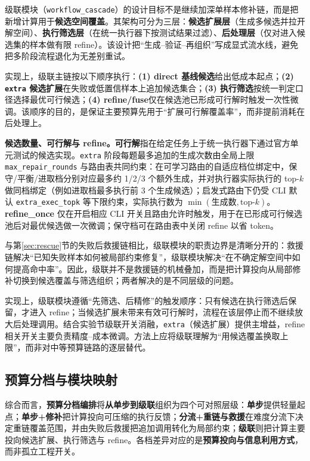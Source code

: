 级联模块（\texttt{workflow\_cascade}）的设计目标不是继续加深单样本修补链，而是把新增计算用于\textbf{候选空间覆盖}。其架构可分为三层：\textbf{候选扩展层}（生成多候选并拉开解空间）、\textbf{执行筛选层}（在统一执行器下按测试结果过滤）、\textbf{后处理层}（仅对进入候选集的样本做有限 refine）。该设计把“生成--验证--再组织”写成显式流水线，避免把多阶段流程退化为无差别重试\cite{li2022alphacode,li2025sstar}。

实现上，级联主链按以下顺序执行：\textbf{(1) direct 基线候选}给出低成本起点；\textbf{(2) \texttt{extra} 候选扩展}在失败或低置信样本上追加候选集合；\textbf{(3) 执行筛选}按统一判定口径选择最优可行候选；\textbf{(4) refine/fuse}仅在候选池已形成可行解时触发一次性微调。该顺序的目的，是保证主要预算先用于“扩展可行解覆盖率”，而非提前消耗在后处理上。

\textbf{候选数量、可行解与 refine。}\textbf{可行解}指在给定任务上于统一执行器下通过官方单元测试的候选实现。\texttt{extra} 阶段每题最多追加的生成次数由全局上限 \texttt{max\_repair\_rounds} 与路由表共同约束：在可学习路由的自适应档位绑定中，保守/平衡/进取档分别对应最多约 1/2/3 个额外生成，并对执行器实际执行的 top-$k$ 做同档绑定（例如进取档最多执行前 3 个生成候选）；启发式路由下仍受 CLI 默认 \texttt{extra\_exec\_topk} 等下限约束，实际执行数为 $\min(\text{生成数},\text{top-}k)$。\textbf{refine\_once} 仅在开启相应 CLI 开关且路由允许时触发，用于在已形成可行候选池后对最优候选做一次微调；保守档可在路由表中关闭 refine 以省 token。

与第\ref{sec:rescue}节的失败后救援链相比，级联模块的职责边界是清晰分开的：救援链解决“已知失败样本如何被局部约束修复”，级联模块解决“在不确定解空间中如何提高命中率”。因此，级联并不是救援链的机械叠加，而是把计算投向从局部修补切换到候选覆盖与筛选组织；两者解决的是不同层级的问题。

实现上，级联模块遵循“先筛选、后精修”的触发顺序：只有候选在执行筛选后保留，才进入 refine；当候选扩展未带来有效可行解时，流程在该层停止而不继续放大后处理调用。结合实验节级联开关消融，\texttt{extra}（候选扩展）提供主增益，refine 相关开关主要负责精度--成本微调。方法上应将级联理解为“用候选覆盖换取上限”，而非对中等预算链路的逐层替代。

\subsection{预算分档与模块映射}

综合而言，\textbf{预算分档编排}将\textbf{从单步到级联}组织为四个可对照层级：\textbf{单步}提供轻量起点；\textbf{单步+修补}把计算投向可压缩的执行反馈；\textbf{分流+重链与救援}在难度分流下决定重链覆盖范围，并由失败后救援把追加调用转化为局部约束；\textbf{级联}则把计算主要投向候选扩展、执行筛选与 refine。各档差异对应的是\textbf{预算投向与信息利用方式}，而非孤立工程开关。

